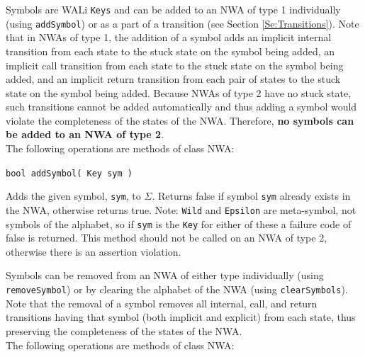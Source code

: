 \documentclass{llncs}
\begin{document}
Symbols are WALi \texttt{Keys} and can be added to an NWA of type 1 individually (using \texttt{addSymbol}) or as a part of a transition (see Section \ref{Se:Transitions}).  Note that in NWAs of type 1, the addition of a symbol adds an implicit internal transition from each state to the stuck state on the symbol being added, an implicit call transition from each state to the stuck state on the symbol being added, and an implicit return transition from each pair of states to the stuck state on the symbol being added.  Because NWAs of type 2 have no stuck state, such transitions cannot be added automatically and thus adding a symbol would violate the completeness of the states of the NWA.  Therefore, \textbf{no symbols can be added to an NWA of type 2}. \\
 
\noindent The following operations are methods of class NWA:

\begin{description}

  \item\texttt{bool addSymbol( Key sym )} \nopagebreak

    Adds the given symbol, \texttt{sym}, to $\Sigma$.  Returns false if symbol \texttt{sym} already exists in the NWA, otherwise returns true.  Note: \texttt{Wild} and \texttt{Epsilon} are meta-symbol, not symbols of the alphabet, so if \texttt{sym} is the \texttt{Key} for either of these a failure code of false is returned.  This method should not be called on an NWA of type 2, otherwise there is an assertion violation. \\

\end{description}

Symbols can be removed from an NWA of either type individually (using \texttt{removeSymbol}) or by clearing the alphabet of the NWA (using \texttt{clearSymbols}).  Note that the removal of a symbol removes all internal, call, and return transitions having that symbol (both implicit and explicit) from each state, thus preserving the completeness of the states of the NWA. \\ 

\noindent The following operations are methods of class NWA:
\end{document}
